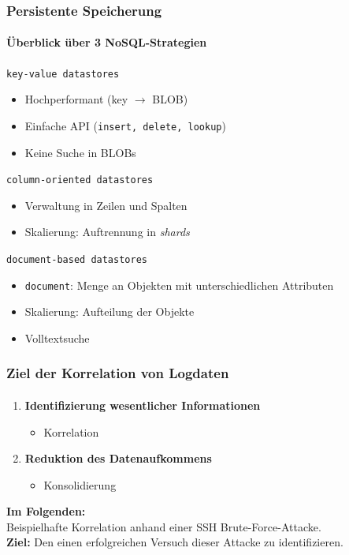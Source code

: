 \begin{frame}
\frametitle{Persistente Speicherung}
\framesubtitle{Überblick über 3 NoSQL-Strategien}

\begin{block}{\texttt{key-value datastores}}
    \begin{itemize}
        \item Hochperformant (key $\rightarrow$ BLOB)
        \item Einfache API (\texttt{insert, delete, lookup})
        \item \color{red} Keine Suche in BLOBs
    \end{itemize}
\end{block}
\pause
\begin{block}{\texttt{column-oriented datastores}}
    \begin{itemize}
        \item Verwaltung in Zeilen und Spalten
        \item Skalierung: Auftrennung in \textit{shards}
    \end{itemize}
\end{block}
\pause
\begin{block}{\texttt{document-based datastores}}
    \begin{itemize}
        \item \texttt{document}: Menge an Objekten mit unterschiedlichen Attributen
        \item Skalierung: Aufteilung der Objekte
        \item \color{green} Volltextsuche
    \end{itemize}
\end{block}
\end{frame}

\begin{frame}
\frametitle{Ziel der Korrelation von Logdaten}
\framesubtitle{}

\begin{enumerate}
    \item \textbf{Identifizierung wesentlicher Informationen}
    \begin{itemize}
        \item Korrelation
    \end{itemize}
    \item \textbf{Reduktion des Datenaufkommens}
        \begin{itemize}
        \item Konsolidierung
        \end{itemize}
\end{enumerate}
\pause
\vspace{0.7cm}
\textbf{Im Folgenden:}\\
\vspace{0.5cm}
Beispielhafte Korrelation anhand einer SSH Brute-Force-Attacke.\\
\vspace{0.5cm}
\textbf{Ziel:} Den {\color{red}einen} erfolgreichen Versuch dieser Attacke zu 
identifizieren.
\end{frame}


